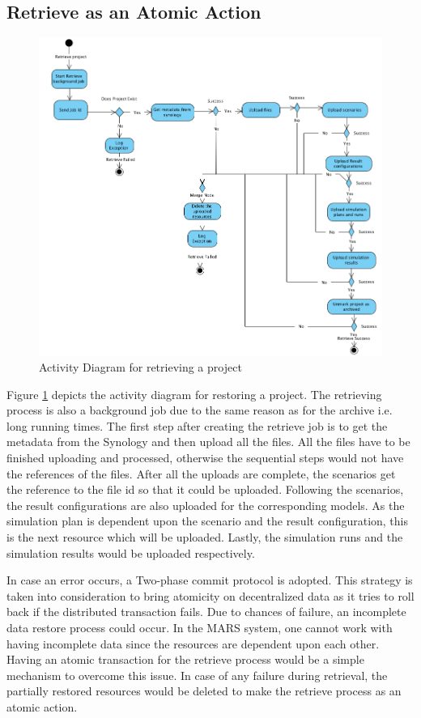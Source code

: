 \subsection{Retrieve as an Atomic Action}
\begin{figure}[H]
    \centering \includegraphics[scale=0.45]{grafiken/restoreActivity.png}
    \caption{Activity Diagram for retrieving a project}
    \label{fig:activityRestore}
\end{figure}

Figure \ref{fig:activityRestore} depicts the activity diagram for restoring a project. The retrieving process is also a background job due to the same reason
as for the archive i.e. long running times. The first step after creating the retrieve job is to get the metadata from the Synology and then upload all the files.
All the files have to be finished uploading and processed, otherwise the sequential steps would not have the references of the files. After all the uploads are complete,
the scenarios get the reference to the file id so that it could be uploaded. Following the scenarios, the result configurations are also uploaded for the corresponding models.
As the simulation plan is dependent upon the scenario and the result configuration, this is the next resource which will be uploaded. Lastly, the simulation runs
and the simulation results would be uploaded respectively. 

In case an error occurs, a Two-phase commit protocol \cite{atomic} is adopted. This strategy is taken into consideration to bring atomicity on decentralized data
as it tries to roll back if the distributed transaction fails.
Due to chances of failure, an incomplete data restore process could occur. In the MARS system, one cannot work with having
incomplete data since the resources are dependent upon each other. Having an atomic transaction for the retrieve process would be a simple mechanism to overcome
this issue. In case of any failure during retrieval, the partially restored resources would be deleted to make the retrieve process as an atomic action.

